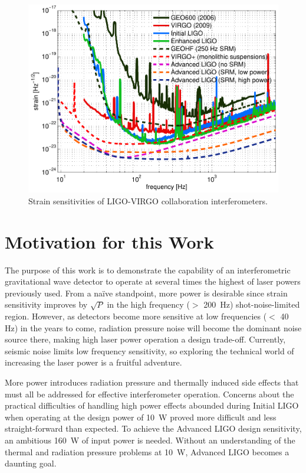 \begin{figure}
\begin{centering}
\includegraphics[width=1.0\textwidth]{figures/GWnetwork_strains.pdf}
\caption[Strain sensitivities of LIGO-VIRGO collaboration
interferometers]{Strain sensitivities of LIGO-VIRGO collaboration
  interferometers.}
\label{fig:h_all}
\end{centering}
\end{figure}


\section{Motivation for this Work}
The purpose of this work is to demonstrate the capability of an
interferometric gravitational wave detector to operate at several
times the highest of laser powers previously used. From a na\"ive
standpoint, more power is desirable since strain sensitivity improves
by $\sqrt{P}$ in the high frequency ($>$ 200~Hz) shot-noise-limited
region. However, as detectors become more sensitive at low frequencies
($<$ 40 Hz) in the years to come, radiation pressure noise will become
the dominant noise source there, making high laser power operation a
design trade-off. Currently, seismic noise limits low frequency
sensitivity, so exploring the technical world of increasing the laser
power is a fruitful adventure.

More power introduces radiation pressure and thermally induced side
effects that must all be addressed for effective interferometer
operation. Concerns about the practical difficulties of handling high
power effects abounded during Initial LIGO when operating at the
design power of 10~W proved more difficult and less straight-forward
than expected. To achieve the Advanced LIGO design sensitivity, an
ambitious 160~W of input power is needed. Without an understanding of
the thermal and radiation pressure problems at 10~W, Advanced LIGO
becomes a daunting goal.

